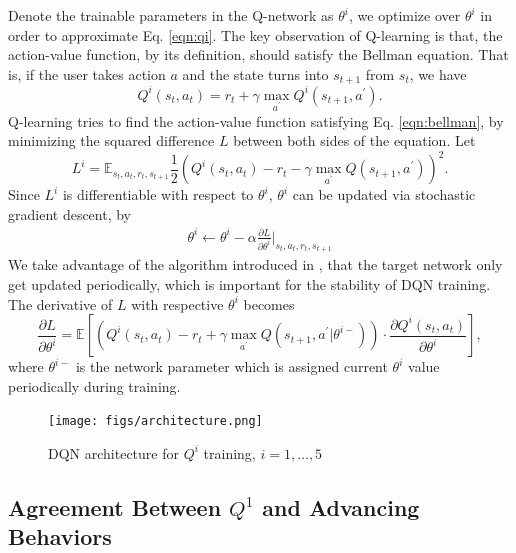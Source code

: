 \documentclass{sigchi}
\begin{document}
Denote the trainable parameters in the Q-network as $\theta^i$, we optimize over $\theta^i$ in order to approximate Eq. \eqref{eqn:qi}. The key observation of Q-learning is that, the action-value function, by its definition, should satisfy the Bellman equation. That is, if the user takes action $a$ and the state turns into $s_{t+1}$ from $s_t$, we have
\begin{equation}
Q^i(s_t,a_t)=r_{t} + \gamma \max_{a^\prime}Q^i(s_{t+1}, a^\prime). \label{eqn:bellman}
\end{equation}
Q-learning tries to find the action-value function satisfying Eq. \eqref{eqn:bellman}, by minimizing the squared difference $L$ between both sides of the equation. Let
\begin{equation*}
L^i=\mathbb{E}_{s_t, a_t, r_t, s_{t+1}} \frac{1}{2}(Q^i(s_t,a_t)- r_{t} - \gamma\max_{a^\prime}Q(s_{t+1}, a^\prime))^2.
\end{equation*}
Since $L^i$ is differentiable with respect to $\theta^i$, $\theta^i$ can be updated via stochastic gradient descent, by
\begin{eqnarray*}
\theta^i \leftarrow \theta^i - \alpha\frac{\partial L}{\partial \theta^i}\Big|_{s_t, a_t, r_t, s_{t+1}}
\end{eqnarray*}
We take advantage of the algorithm introduced in \cite{}, that the target network only get updated periodically, which is important for the stability of DQN training. The derivative of $L$ with respective $\theta^i$ becomes
$$\frac{\partial L}{\partial \theta^i} = \mathbb{E}\left[ (Q^i(s_t,a_t)- r_{t} + \gamma\max_{a^\prime}Q(s_{t+1}, a^\prime | \theta^{i -}))\cdot \frac{\partial{Q^i(s_t,a_t)}}{\partial{\theta^i}}\right],$$
where $\theta^{i-}$ is the network parameter which is assigned current $\theta^i$ value periodically during training.

\begin{figure}[t]
  \centering
  \texttt{[image: figs/architecture.png]}
  \caption{DQN architecture for $Q^i$ training, $i=1, \dots,5$}
  \label{fig:architecture}
\end{figure}

\subsection{Agreement Between $Q^1$ and Advancing Behaviors}
\end{document}
